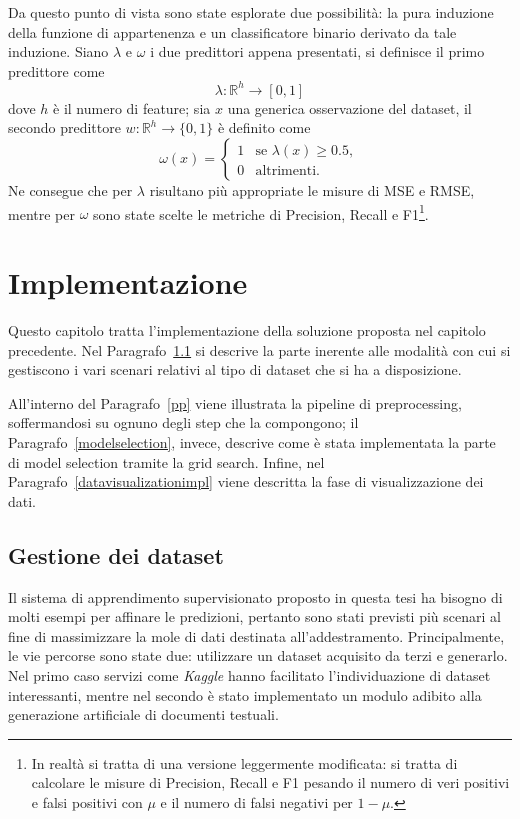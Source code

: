 \documentclass[12pt]{report}
\theoremstyle{definition}
\begin{document}
Da questo punto di vista sono state esplorate due possibilità: la pura induzione della funzione di appartenenza e un classificatore binario derivato da tale induzione.
Siano $\lambda$ e $\omega$ i due predittori appena presentati, si definisce il primo predittore come
\begin{equation}
    \lambda: \mathbb{R}^h \rightarrow [0,1]
\end{equation}
dove $h$ è il numero di feature; sia $x$ una generica osservazione del dataset, il secondo predittore $w: \mathbb R^h \rightarrow \{ 0, 1 \}$ è definito come
\begin{equation}
    \omega(x) = \begin{cases} 1 & \mbox{se } \lambda(x) \geq 0.5, \\ 0 & \mbox{altrimenti.} \end{cases}
\end{equation}
Ne consegue che per $\lambda$ risultano più appropriate le misure di MSE e RMSE, mentre per $\omega$ sono state scelte le metriche di Precision, Recall e F1\footnote{In realtà si tratta di una versione leggermente modificata: si tratta di calcolare le misure di Precision, Recall e F1 pesando il numero di veri positivi e falsi positivi con $\mu$ e il numero di falsi negativi per $1-\mu$.}.

\chapter{Implementazione}
\label{Capitolo 3}
\onehalfspacing
Questo capitolo tratta l'implementazione della soluzione proposta nel capitolo precedente. Nel Paragrafo~\ref{datasethandle} si descrive la parte inerente alle modalità con cui si gestiscono i vari scenari relativi al tipo di dataset che si ha a disposizione.

All'interno del Paragrafo~\ref{pp} viene illustrata la pipeline di preprocessing, soffermandosi su ognuno degli step che la compongono; il Paragrafo~\ref{modelselection}, invece, descrive come è stata implementata la parte di model selection tramite la grid search.
Infine, nel Paragrafo~\ref{datavisualizationimpl} viene descritta la fase di visualizzazione dei dati.

\section{Gestione dei dataset}\label{datasethandle}
Il sistema di apprendimento supervisionato proposto in questa tesi ha bisogno di molti esempi per affinare le predizioni, pertanto sono stati previsti più scenari al fine di massimizzare la mole di dati destinata all'addestramento. Principalmente, le vie percorse sono state due: utilizzare un dataset acquisito da terzi e generarlo.
Nel primo caso servizi come \textit{Kaggle} hanno facilitato l'individuazione di dataset interessanti, mentre nel secondo è stato implementato un modulo adibito alla generazione artificiale di documenti testuali.
\end{document}

